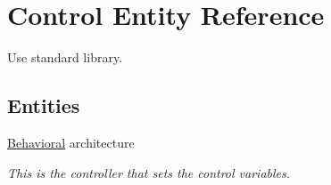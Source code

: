 \hypertarget{class_control}{\section{\-Control \-Entity \-Reference}
\label{class_control}
}


\-Use standard library.  


\subsection*{\-Entities}
\begin{DoxyCompactItemize}
\item 
\hyperlink{class_control_1_1_behavioral}{\-Behavioral} architecture
\begin{DoxyCompactList}\small\item\em \-This is the controller that sets the control variables. \end{DoxyCompactList}\end{DoxyCompactItemize}
\*
\*
